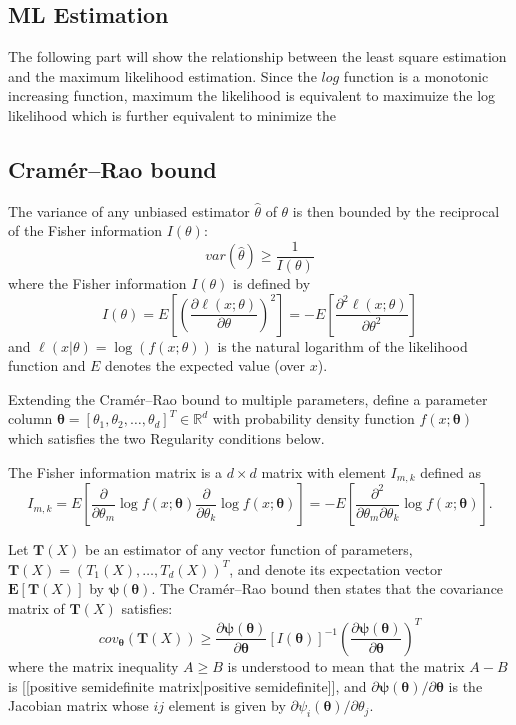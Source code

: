 \documentclass[a4paper]{report}
\begin{document}
\subsection{ML Estimation}
 The following part will show the relationship between the least square estimation and the maximum likelihood estimation.
Since the $log$ function is a monotonic increasing function, maximum the likelihood is equivalent to maximuize the log likelihood which is further equivalent to minimize the

\subsection{Cramér–Rao bound}
The variance of any unbiased estimator $\hat{\theta }$ of $\theta$  is then bounded by the reciprocal of the Fisher information $I(\theta )$:
\begin{equation}
{var} ({\hat {\theta }}) \geq {\frac {1}{I(\theta )}}
\end{equation}
where the Fisher information $I(\theta )$ is defined by
\begin{equation}
I(\theta )= {E} \left[\left({\frac {\partial \ell (x;\theta )}{\partial \theta }}\right)^{2}\right]=- {E} \left[{\frac {\partial ^{2}\ell (x;\theta )}{\partial \theta ^{2}}}\right]
\end{equation}
and $\ell (x|\theta )=\log(f(x;\theta ))$ is the natural logarithm of the likelihood function and  ${E}$ denotes the expected value (over $x$).

Extending the Cramér–Rao bound to multiple parameters, define a parameter column $
\mathbf{\theta} = \left[ \theta_1, \theta_2, \dots, \theta_d \right]^T \in \mathbb{R}^d $
with probability density function $f(x; \mathbf{\theta})$ which satisfies the two Regularity conditions below.

The Fisher information matrix is a $d \times d$ matrix with element $I_{m, k}$ defined as
$$
I_{m, k}
= {E} \left[
\frac{\partial }{\partial \theta_m} \log f\left(x; \mathbf{\theta}\right)
\frac{\partial }{\partial \theta_k} \log f\left(x; \mathbf{\theta}\right)
\right] = -{E} \left[
\frac{\partial ^2}{\partial \theta_m \partial \theta_k} \log f\left(x; \mathbf{\theta}\right)
\right].
$$

Let $\mathbf{T}(X)$ be an estimator of any vector function of parameters, $\mathbf{T}(X) = (T_1(X), \ldots, T_d(X))^T$, and denote its expectation vector $\mathbf{E}[\mathbf{T}(X)]$ by $\mathbf{\psi}(\mathbf{\theta})$. The Cramér–Rao bound then states that the covariance matrix of $\mathbf{T}(X)$ satisfies:
$$
{cov}_{\mathbf{\theta}}\left(\mathbf{T}(X)\right)
\geq
\frac
{\partial \mathbf{\psi} \left(\mathbf{\theta}\right)}
{\partial \mathbf{\theta}}
[I\left(\mathbf{\theta}\right)]^{-1}
\left(
\frac
{\partial \mathbf{\psi}\left(\mathbf{\theta}\right)}
{\partial \mathbf{\theta}}
\right)^T
$$
where the matrix inequality $A \ge B$ is understood to mean that the matrix $A-B$ is [[positive semidefinite matrix|positive semidefinite]], and $\partial \mathbf{\psi}(\mathbf{\theta})/\partial \mathbf{\theta}$ is the Jacobian matrix whose $ij$ element is given by $\partial \psi_i(\mathbf{\theta})/\partial \theta_j$.
\end{document}
